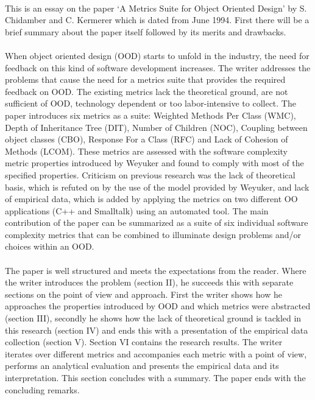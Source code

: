 \paragraph{}
This is an essay on the paper `A Metrics Suite for Object Oriented Design' by S. Chidamber and C.
Kermerer which is dated from June 1994. First there will be a brief summary about the paper itself followed by
its merits and drawbacks.

\paragraph{}
When object oriented design (OOD) starts to unfold in the industry, the need for feedback on this kind of software
development increases. The writer addresses the problems that cause the need for a metrics suite that provides the
required feedback on OOD. The existing metrics lack the theoretical ground, are not sufficient of OOD,
technology dependent or too labor-intensive to collect.
The paper introduces six metrics as a suite: Weighted Methods Per Class (WMC), Depth of Inheritance Tree (DIT),
Number of Children (NOC), Coupling between object classes (CBO), Response For a Class (RFC) and Lack of
Cohesion of Methods (LCOM). These metrics are assessed with the software complexity metric properties introduced by
Weyuker \autocite{WEYUKER} and found to comply with most of the specified properties.
Criticism on previous research was the lack of theoretical basis, which is refuted on by the use of the
model provided by Weyuker, and lack of empirical data, which is added by applying the metrics on two different OO
applications (C++ and Smalltalk) using an automated tool. The main contribution of the paper can be summarized as a
suite of six individual software complexity metrics that can be combined to illuminate design problems and/or choices
within an OOD.

\paragraph{}
The paper is well structured and meets the expectations from the reader. Where the writer introduces the problem
(section II), he succeeds this with separate sections on the point of view and approach. First the writer shows how he
approaches the properties introduced by OOD and which metrics were abstracted (section III), secondly he shows how the
lack of theoretical ground is tackled in this research (section IV) and ends this with a presentation of the empirical
data collection (section V). Section VI contains the research results. The writer iterates over different metrics and
accompanies each metric with a point of view, performs an analytical evaluation and presents the empirical data and its
interpretation. This section concludes with a summary. The paper ends with the concluding remarks.

